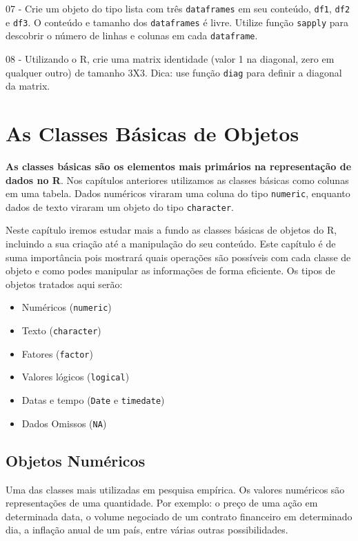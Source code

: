 \documentclass[
  11pt,
]{book}
\providecommand{\tightlist}{%
  \setlength{\itemsep}{0pt}\setlength{\parskip}{0pt}}
\begin{document}
07 -
Crie um objeto do tipo lista com três \texttt{dataframes} em seu conteúdo, \texttt{df1}, \texttt{df2} e \texttt{df3}. O conteúdo e tamanho dos \texttt{dataframes} é livre. Utilize função \texttt{sapply} para descobrir o número de linhas e colunas em cada \texttt{dataframe}.

08 -
Utilizando o R, crie uma matrix identidade (valor 1 na diagonal, zero em qualquer outro) de tamanho 3X3. Dica: use função \texttt{diag} para definir a diagonal da matrix.

\hypertarget{classes-basicas}{%
\chapter{As Classes Básicas de Objetos}\label{classes-basicas}}

\textbf{As classes básicas são os elementos mais primários na representação de dados no R}. Nos capítulos anteriores utilizamos as classes básicas como colunas em uma tabela. Dados numéricos viraram uma coluna do tipo \texttt{numeric}, enquanto dados de texto viraram um objeto do tipo \texttt{character}.

Neste capítulo iremos estudar mais a fundo as classes básicas de objetos do R, incluindo a sua criação até a manipulação do seu conteúdo. Este capítulo é de suma importância pois mostrará quais operações são possíveis com cada classe de objeto e como podes manipular as informações de forma eficiente. Os tipos de objetos tratados aqui serão:

\begin{itemize}
\tightlist
\item
  Numéricos (\texttt{numeric})
\item
  Texto (\texttt{character})
\item
  Fatores (\texttt{factor})
\item
  Valores lógicos (\texttt{logical})
\item
  Datas e tempo (\texttt{Date} e \texttt{timedate})
\item
  Dados Omissos (\texttt{NA})
\end{itemize}

\hypertarget{objetos-numuxe9ricos}{%
\section{Objetos Numéricos}\label{objetos-numuxe9ricos}}

Uma das classes mais utilizadas em pesquisa empírica. Os valores numéricos são representações de uma quantidade. Por exemplo: o preço de uma ação em determinada data, o volume negociado de um contrato financeiro em determinado dia, a inflação anual de um país, entre várias outras possibilidades.
\end{document}
